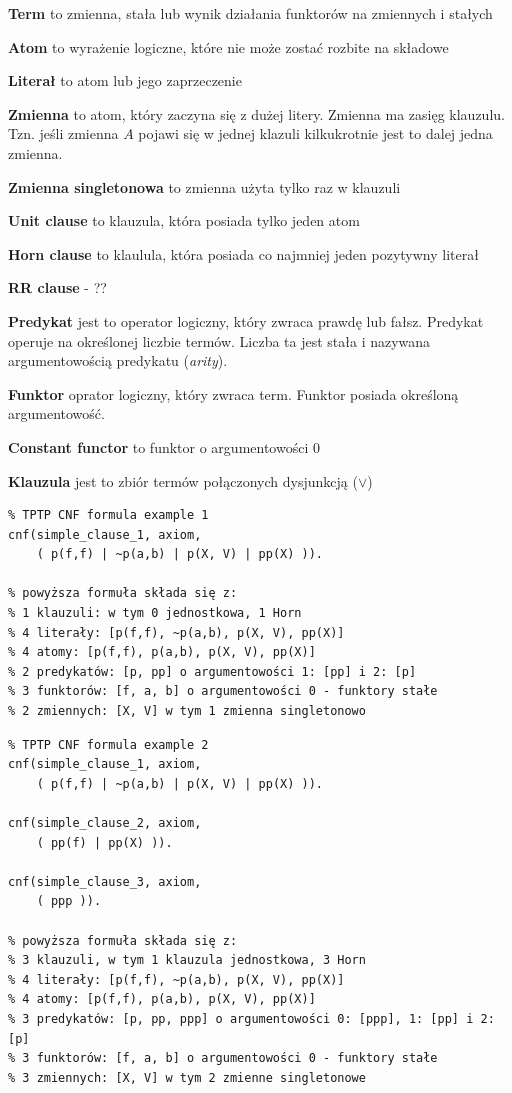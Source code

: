 \documentclass[a4paper,12pt]{article}
\begin{document}
\textbf{Term}
to zmienna, stała lub wynik działania funktorów na zmiennych i stałych

\textbf{Atom}
to wyrażenie logiczne, które nie może zostać rozbite na składowe


\textbf{Literał}
to atom lub jego zaprzeczenie

\textbf{Zmienna}
to atom, który zaczyna się z dużej litery. Zmienna ma zasięg klauzulu. Tzn. jeśli zmienna $A$ pojawi się w jednej klazuli kilkukrotnie jest to dalej jedna zmienna.

\textbf{Zmienna singletonowa}
to zmienna użyta tylko raz w klauzuli

\textbf{Unit clause}
to klauzula, która posiada tylko jeden atom

\textbf{Horn clause}
to klaulula, która posiada co najmniej jeden pozytywny literał

\textbf{RR clause} - ??

\textbf{Predykat}
jest to operator logiczny, który zwraca prawdę lub fałsz. Predykat operuje na określonej liczbie termów. Liczba ta jest stała i nazywana argumentowością predykatu (\textit{arity}).

\textbf{Funktor}
oprator logiczny, który zwraca term. Funktor posiada określoną argumentowość.

\textbf{Constant functor}
to funktor o argumentowości 0

\textbf{Klauzula}
jest to zbiór termów połączonych dysjunkcją ($\lor$)


\begin{verbatim}
% TPTP CNF formula example 1
cnf(simple_clause_1, axiom,
    ( p(f,f) | ~p(a,b) | p(X, V) | pp(X) )).

% powyższa formuła składa się z:
% 1 klauzuli: w tym 0 jednostkowa, 1 Horn
% 4 literały: [p(f,f), ~p(a,b), p(X, V), pp(X)]
% 4 atomy: [p(f,f), p(a,b), p(X, V), pp(X)]
% 2 predykatów: [p, pp] o argumentowości 1: [pp] i 2: [p]
% 3 funktorów: [f, a, b] o argumentowości 0 - funktory stałe
% 2 zmiennych: [X, V] w tym 1 zmienna singletonowo
\end{verbatim}

\begin{verbatim}
% TPTP CNF formula example 2
cnf(simple_clause_1, axiom,
    ( p(f,f) | ~p(a,b) | p(X, V) | pp(X) )).

cnf(simple_clause_2, axiom,
    ( pp(f) | pp(X) )).

cnf(simple_clause_3, axiom,
    ( ppp )).

% powyższa formuła składa się z:
% 3 klauzuli, w tym 1 klauzula jednostkowa, 3 Horn
% 4 literały: [p(f,f), ~p(a,b), p(X, V), pp(X)]
% 4 atomy: [p(f,f), p(a,b), p(X, V), pp(X)]
% 3 predykatów: [p, pp, ppp] o argumentowości 0: [ppp], 1: [pp] i 2: [p]
% 3 funktorów: [f, a, b] o argumentowości 0 - funktory stałe
% 3 zmiennych: [X, V] w tym 2 zmienne singletonowe
\end{verbatim}
\end{document}
